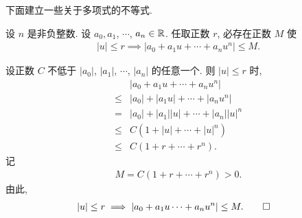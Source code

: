 









下面建立一些关于多项式的不等式.

\begin{proposition}
    设 $n$ 是非负整数. 设 $a_0, a_1$, $\cdots$, $a_n \in \mathbb{R}$. 任取正数 $r$, 必存在正数 $M$ 使
    \begin{align*}
        |u| \leq r \implies |a_0 + a_1 u + \cdots + a_n u^n| \leq M.
    \end{align*}
\end{proposition}

\begin{pf}
    设正数 $C$ 不低于 $|a_0|$, $|a_1|$, $\cdots$, $|a_n|$ 的任意一个. 则 $|u| \leq r$ 时,
    \begin{align*}
                & |a_0 + a_1 u + \cdots + a_n u^n|         \\
        \leq {} & |a_0| + |a_1 u| + \cdots + |a_n u^n|     \\
        = {}    & |a_0| + |a_1| |u| + \cdots + |a_n| |u|^n \\
        \leq {} & C (1 + |u| + \cdots + |u|^n)             \\
        \leq {} & C (1 + r + \cdots + r^n).
    \end{align*}
    记
    \begin{align*}
        M = C (1 + r + \cdots + r^n) > 0.
    \end{align*}
    由此,
    \begin{align*}
         & |u| \leq r \implies |a_0 + a_1 u \cdots + a_n u^n| \leq M. \qedhere
    \end{align*}
\end{pf}

